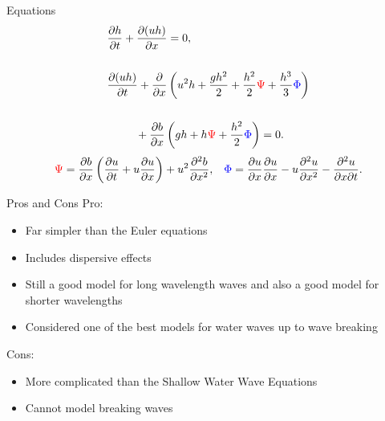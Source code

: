 \documentclass[pdf]{beamer}
\begin{document}
\begin{frame}{Equations}
	\begin{subequations}
		\begin{align*}
		&\frac{\partial h}{\partial t} + \dfrac{\partial (uh)}{\partial x} = 0,  \\ \\
		&\dfrac{\partial (uh)}{\partial t} + \dfrac{\partial}{\partial x} \left ( u^2h + \dfrac{gh^2}{2} + \dfrac{h^2}{2}{ \color{red}\Psi } + \dfrac{h^3}{3}{ { \color{blue} \Phi } }  \right )   \\ \\ &\quad \quad \; \; +  \dfrac{\partial b}{\partial x} \left (gh +   h { \color{red}\Psi } + \dfrac{h^2}{2}{ { \color{blue} \Phi } }  \right ) = 0.
		\end{align*}
	\end{subequations}
		\begin{align*}
		&{ \color{red}\Psi }  = \dfrac{\partial b}{\partial x}\left(\dfrac{\partial u}{\partial t} + u\dfrac{\partial u}{\partial x} \right)  + u^2\dfrac{\partial^2 b}{\partial x^2}, &
		{ \color{blue} \Phi }  = \dfrac{\partial u }{\partial x} \dfrac{\partial u}{\partial x} -u \dfrac{\partial^2 u}{\partial x^2}  - \dfrac{\partial^2 u}{\partial x \partial t} .
		\end{align*}
\end{frame}
\begin{frame}{Pros and Cons}
	Pro:
	\begin{itemize}
		\item Far simpler than the Euler equations
		\item Includes dispersive effects
		\item Still a good model for long wavelength waves and also a good model for shorter wavelengths
		\item Considered one of the best models for water waves up to wave breaking
	\end{itemize}
	Cons:
	\begin{itemize}
		\item More complicated than the Shallow Water Wave Equations
		\item Cannot model breaking waves
	\end{itemize}
\end{frame}
\end{document}
